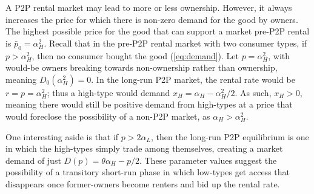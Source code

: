 \documentclass[11pt]{article}
\begin{document}

A P2P rental market may lead to more or less ownership.
However, it always increases the price for which there is non-zero demand for the good by owners. 
The highest possible price for the good that can support a market pre-P2P rental is $\bar{p}_0 = \alpha_H^2$.
Recall that in the pre-P2P rental market with two consumer types, if $p > \alpha_H^2$, then no consumer bought the good (\ref{eq:demand}).
Let $p = \alpha_H^2$, with would-be owners breaking towards non-ownership rather than ownership, meaning $D_0(\alpha_H^2) = 0$. 
In the long-run P2P market, the rental rate would be $r = p = \alpha_H^2$; thus a high-type would demand $x_H = \alpha_H - \alpha_H^2/2$.
As such, $x_H > 0$, meaning there would still be positive demand from high-types at a price that would foreclose the possibility of a non-P2P market, as  $\alpha_H > \alpha_H^2$.  

One interesting aside is that if $p > 2 \alpha_L$, then the long-run P2P equilibrium is one in which the high-types simply trade among themselves, creating a market demand of just $D(p) = \theta \alpha_H - p/2$. 
These parameter values suggest the possibility of a transitory short-run phase in which low-types get access that disappears once former-owners become renters and bid up the rental rate. 
\end{document}
